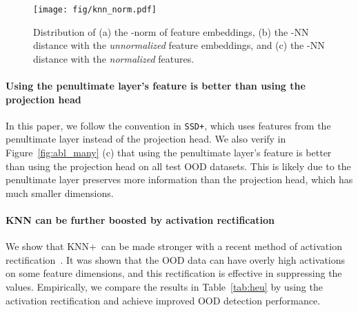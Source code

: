 \documentclass[nohyperref]{article}
\newcommand{\methodplus}{{KNN+}}
\theoremstyle{plain}
\theoremstyle{definition}
\theoremstyle{remark}
\begin{document}
\begin{figure}[t]
\begin{center}
		\texttt{[image: fig/knn\_norm.pdf]}
	\end{center}	
	\vspace{-0.3cm}
	\caption{\small Distribution of (a) the -norm of feature embeddings, (b) the -NN distance with the \emph{unnormalized} feature embeddings, and (c) the -NN distance with the \emph{normalized} features. }
	\label{fig:knn_norm}
\vspace{-0.3cm}
\end{figure} 










\vspace{-0.1cm}
\paragraph{Using the penultimate layer's feature is better than using the projection head}
In this paper, we follow the convention in \texttt{SSD+}, which uses features from the penultimate layer instead of the projection head. We also verify in Figure~\ref{fig:abl_many} (c) that using the penultimate layer's feature is better than using the projection head on all test OOD datasets. This is likely due to the penultimate layer preserves more information than the projection head, which has much smaller dimensions. 


\vspace{-0.1cm}
\paragraph{KNN can be further boosted by activation rectification} We show that \methodplus~can be made stronger with a recent method of activation rectification~\citep{sun2021react}. It was shown that the OOD data can have overly high activations on some feature dimensions, and this rectification is effective in suppressing the values. Empirically, we compare the results in Table~\ref{tab:heu} by using the activation rectification and achieve improved OOD detection performance. 


\begin{table}[h]
    \centering
    \caption{Comparison of KNN-based method with and without activation truncation. The ID data is ImageNet-1k. The value is averaged over all test OOD datasets.}
    \label{tab:heu}
\end{table}
\end{document}
